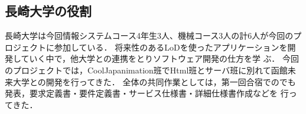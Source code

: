 \subsection{長崎大学の役割}
\par
長崎大学は今回情報システムコース4年生3人、機械コース3人の計6人が今回のプロジェクトに参加している．
将来性のあるLoDを使ったアプリケーションを開発していく中で，他大学との連携をとりソフトウェア開発の仕方を学
ぶ．
今回のプロジェクトでは，CoolJapanimation班でHtml班とサーバ班に別れて函館未来大学との開発を行ってきた．
全体の共同作業としては，第一回合宿でのでも発表，要求定義書・要件定義書・サービス仕様書・詳細仕様書作成などを
行ってきた．

